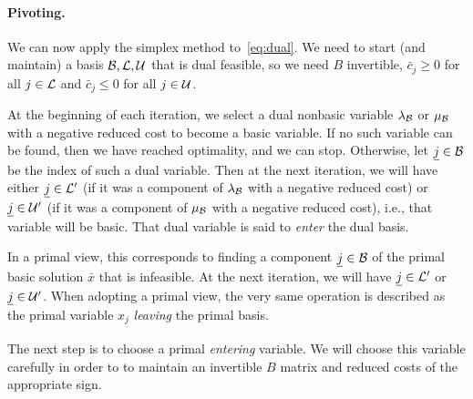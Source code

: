 \paragraph{Pivoting.}

\newcommand{\uj}[0]{\underline{j}}
\newcommand{\uk}[0]{\underline{k}}

We can now apply the simplex method to~\eqref{eq:dual}.
We need to start (and maintain) a basis $\mathcal{B}, \mathcal{L}, \mathcal{U}$ that
is dual feasible, so we need $B$ invertible,
$\bar c_j \geq 0$ for all $j \in \mathcal{L}$
and $\bar c_j \leq 0$ for all $j \in \mathcal{U}$.

At the beginning of each iteration, we select a dual nonbasic
variable $\lambda_{\mathcal{B}}$ or $\mu_{\mathcal{B}}$ with a negative reduced cost to
become a basic variable.
If no such variable can be found, then we have 
reached optimality, and we can stop.
Otherwise, let $\uj \in \B$ be the index of such
a dual variable. Then at the next iteration, we will have
either $\uj \in \NL'$ (if it was a component of $\lambda_{\mathcal{B}}$ with
a negative reduced cost) or $\uj \in \NU'$
(if it was a component of $\mu_{\mathcal{B}}$ with
a negative reduced cost), i.e., that variable will
be basic. That dual variable is said
to \emph{enter} the dual basis.

In a primal view, this corresponds to finding a component $\uj \in \B$
of the primal basic solution $\bar x$ that is infeasible.
At the next iteration, we will have $\uj \in \NL'$ or $\uj \in \NU'$.
When adopting a primal view, the very same operation is described as
the primal variable $x_{\uj}$ \emph{leaving} the primal basis.

The next step is to choose a primal \emph{entering} variable.
We will choose this variable carefully in order to
to maintain an invertible $B$ matrix and reduced costs of the
appropriate sign.

